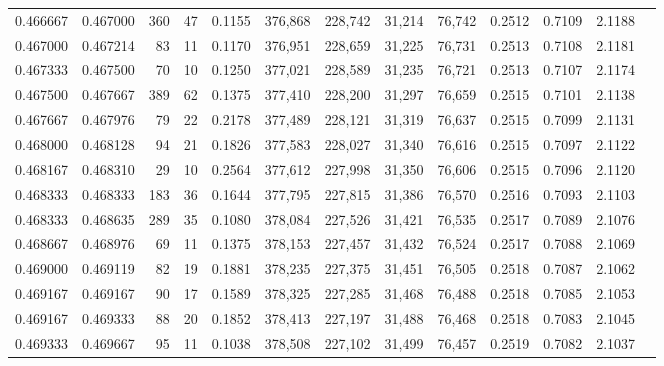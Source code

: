 \begin{tabular}{rrrrrrrrrrrrr}
0.466667 & 0.467000 &   360 &  47 &                                     0.1155 & 376,868 & 228,742 &  31,214 &  76,742 & 0.2512 & 0.7109 & 2.1188 \\
0.467000 & 0.467214 &    83 &  11 &                                     0.1170 & 376,951 & 228,659 &  31,225 &  76,731 & 0.2513 & 0.7108 & 2.1181 \\
0.467333 & 0.467500 &    70 &  10 &                                     0.1250 & 377,021 & 228,589 &  31,235 &  76,721 & 0.2513 & 0.7107 & 2.1174 \\
0.467500 & 0.467667 &   389 &  62 &                                     0.1375 & 377,410 & 228,200 &  31,297 &  76,659 & 0.2515 & 0.7101 & 2.1138 \\
0.467667 & 0.467976 &    79 &  22 &                                     0.2178 & 377,489 & 228,121 &  31,319 &  76,637 & 0.2515 & 0.7099 & 2.1131 \\
0.468000 & 0.468128 &    94 &  21 &                                     0.1826 & 377,583 & 228,027 &  31,340 &  76,616 & 0.2515 & 0.7097 & 2.1122 \\
0.468167 & 0.468310 &    29 &  10 &                                     0.2564 & 377,612 & 227,998 &  31,350 &  76,606 & 0.2515 & 0.7096 & 2.1120 \\
0.468333 & 0.468333 &   183 &  36 &                                     0.1644 & 377,795 & 227,815 &  31,386 &  76,570 & 0.2516 & 0.7093 & 2.1103 \\
0.468333 & 0.468635 &   289 &  35 &                                     0.1080 & 378,084 & 227,526 &  31,421 &  76,535 & 0.2517 & 0.7089 & 2.1076 \\
0.468667 & 0.468976 &    69 &  11 &                                     0.1375 & 378,153 & 227,457 &  31,432 &  76,524 & 0.2517 & 0.7088 & 2.1069 \\
0.469000 & 0.469119 &    82 &  19 &                                     0.1881 & 378,235 & 227,375 &  31,451 &  76,505 & 0.2518 & 0.7087 & 2.1062 \\
0.469167 & 0.469167 &    90 &  17 &                                     0.1589 & 378,325 & 227,285 &  31,468 &  76,488 & 0.2518 & 0.7085 & 2.1053 \\
0.469167 & 0.469333 &    88 &  20 &                                     0.1852 & 378,413 & 227,197 &  31,488 &  76,468 & 0.2518 & 0.7083 & 2.1045 \\
0.469333 & 0.469667 &    95 &  11 &                                     0.1038 & 378,508 & 227,102 &  31,499 &  76,457 & 0.2519 & 0.7082 & 2.1037 \\

\end{tabular}
